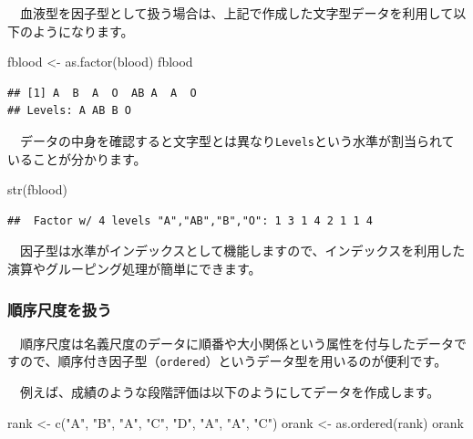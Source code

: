 \documentclass[
  12pt,
]{book}
\newenvironment{Shaded}{\begin{snugshade}}{\end{snugshade}}
\newcommand{\FunctionTok}[1]{\textcolor[rgb]{0.00,0.00,0.00}{#1}}
\newcommand{\NormalTok}[1]{#1}
\newcommand{\OtherTok}[1]{\textcolor[rgb]{0.56,0.35,0.01}{#1}}
\newcommand{\StringTok}[1]{\textcolor[rgb]{0.31,0.60,0.02}{#1}}
\begin{document}
　血液型を因子型として扱う場合は、上記で作成した文字型データを利用して以下のようになります。

\begin{Shaded}
\begin{Highlighting}[numbers=left,,]
\NormalTok{fblood }\OtherTok{\textless{}{-}} \FunctionTok{as.factor}\NormalTok{(blood)}
\NormalTok{fblood}
\end{Highlighting}
\end{Shaded}

\begin{verbatim}
## [1] A  B  A  O  AB A  A  O 
## Levels: A AB B O
\end{verbatim}

　データの中身を確認すると文字型とは異なり\texttt{Levels}という水準が割当られていることが分かります。

\begin{Shaded}
\begin{Highlighting}[numbers=left,,]
\FunctionTok{str}\NormalTok{(fblood)}
\end{Highlighting}
\end{Shaded}

\begin{verbatim}
##  Factor w/ 4 levels "A","AB","B","O": 1 3 1 4 2 1 1 4
\end{verbatim}

　因子型は水準がインデックスとして機能しますので、インデックスを利用した演算やグルーピング処理が簡単にできます。

\hypertarget{ux9806ux5e8fux5c3aux5ea6ux3092ux6271ux3046}{%
\subsubsection*{順序尺度を扱う}\label{ux9806ux5e8fux5c3aux5ea6ux3092ux6271ux3046}}

　順序尺度は名義尺度のデータに順番や大小関係という属性を付与したデータですので、順序付き因子型（\texttt{ordered}）というデータ型を用いるのが便利です。

　例えば、成績のような段階評価は以下のようにしてデータを作成します。

\begin{Shaded}
\begin{Highlighting}[numbers=left,,]
\NormalTok{rank }\OtherTok{\textless{}{-}} \FunctionTok{c}\NormalTok{(}\StringTok{"A"}\NormalTok{, }\StringTok{"B"}\NormalTok{, }\StringTok{"A"}\NormalTok{, }\StringTok{"C"}\NormalTok{, }\StringTok{"D"}\NormalTok{, }\StringTok{"A"}\NormalTok{, }\StringTok{"A"}\NormalTok{, }\StringTok{"C"}\NormalTok{)}
\NormalTok{orank }\OtherTok{\textless{}{-}} \FunctionTok{as.ordered}\NormalTok{(rank)}
\NormalTok{orank}
\end{Highlighting}
\end{Shaded}
\end{document}
